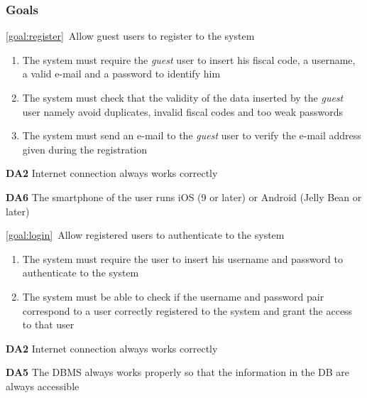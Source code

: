 \subsubsection{Goals}
	\begin{description}
		\item \ref{goal:register}\ Allow guest users to register to the system
			\begin{enumerate}[label=\textbf{R\arabic*}]
			
  				\item The system must require the \emph{guest} user to insert his fiscal code, a username, a valid e-mail and a password to identify him
  				
   				\item The system must check that the validity of the data inserted by the \emph{guest} user namely avoid duplicates, invalid fiscal codes and too weak passwords
   				
   				\item The system must send an e-mail to the \emph{guest} user to verify the e-mail address given during the registration
   
  			\end{enumerate}
  				
				\textbf{DA2} Internet connection always works correctly
				
				\textbf{DA6} The smartphone of the user runs iOS (9 or later) or Android (Jelly Bean or later)
			
  			
		\item \ref{goal:login}\ Allow registered users to authenticate to the system
			\begin{enumerate}[label=\textbf{R\arabic*}, resume]
  				\item The system must require the user to insert his username and password to authenticate to the system
   				\item The system must be able to check if the username and password pair correspond to a user correctly registered to the system and grant the access to that user

			\end{enumerate}
			
			\textbf{DA2} Internet connection always works correctly
			
			\textbf{DA5} The DBMS always works properly so that the information in the DB are always accessible
			

\end{description}
